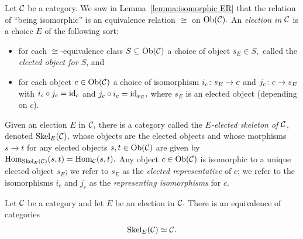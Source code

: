 \documentclass[CT4S-EN-RU]{subfiles}
\begin{document}
\begin{definitionENG}[Skeleton]
Let $\mathcal{C}$ be a category. We saw in Lemma~\ref{lemma:isomorphic ER} that the relation of “being isomorphic” is an equivalence relation $\cong$ on $\textnormal{Ob}(\mathcal{C}).$ An {\em election in $\mathcal{C}$} is a choice $E$ of the following sort:
\begin{itemize}
\item for each $\cong$-equivalence class $S\subseteq\textnormal{Ob}(\mathcal{C})$ a choice of object $s_E\in S,$ called the {\em elected object for $S$}, and
\item for each object $c\in\textnormal{Ob}(\mathcal{C})$ a choice of isomorphism $i_c\colon s_E\rightarrow c$ and $j_c\colon c\rightarrow s_E$ with $i_c\circ j_c=\textnormal{id}_c$ and $j_c\circ i_c=\textnormal{id}_{s_E},$ where $s_E$ is an elected object (depending on $c$).
\end{itemize}
Given an election $E$ in $\mathcal{C},$ there is a category called the {\em $E$-elected skeleton of $\mathcal{C}$}, denoted $\textnormal{Skel}_E(\mathcal{C}),$ whose objects are the elected objects and whose morphisms $s\to t$ for any elected objects $s,t\in\textnormal{Ob}(\mathcal{C})$ are given by $\textnormal{Hom}_{\textnormal{Skel}_E(\mathcal{C})}(s,t)=\textnormal{Hom}_\mathcal{C}(s,t).$ Any object $c\in\textnormal{Ob}(\mathcal{C})$ is isomorphic to a unique elected object $s_E$; we refer to $s_E$ as the {\em elected representative} of $c$; we refer to the isomorphisms $i_c$ and $j_c$ as the {\em representing isomorphisms} for $c.$
\end{definitionENG}

\begin{definitionRUS}[Skeleton]
\end{definitionRUS}

\begin{propositionENG}
Let $\mathcal{C}$ be a category and let $E$ be an election in $\mathcal{C}.$ There is an equivalence of categories $$\textnormal{Skel}_E(\mathcal{C})\simeq\mathcal{C}.$$
\end{propositionENG}

\begin{propositionRUS}
\end{propositionRUS}
\end{document}
